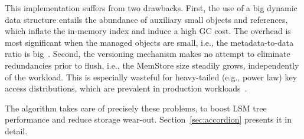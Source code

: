 This implementation suffers from two drawbacks. First, the use of a big dynamic data structure entails 
the abundance of auxiliary small objects and references, which inflate the in-memory index and induce 
a high GC cost. The overhead is most significant when the managed objects are small, i.e., 
the metadata-to-data ratio is big~\cite{Wu2015}. Second, the versioning mechanism 
makes no attempt to eliminate redundancies prior to flush, i.e., the MemStore size  steadily grows, 
independently of the workload. This is especially wasteful for heavy-tailed (e.g., power law) key access distributions, 
which are prevalent in production workloads~\cite{Devineni:2015}. 

The \sys\/ algorithm takes care of precisely these problems, to boost  
LSM tree performance and reduce  storage wear-out. Section~\ref{sec:accordion} 
presents it in detail. 







